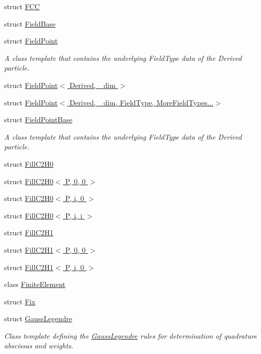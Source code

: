 \begin{DoxyCompactItemize}
struct \hyperlink{structmodel_1_1_f_c_c}{F\+C\+C}
\item 
struct \hyperlink{structmodel_1_1_field_base}{Field\+Base}
\item 
struct \hyperlink{structmodel_1_1_field_point}{Field\+Point}
\begin{DoxyCompactList}\small\item\em A class template that contains the underlying Field\+Type data of the Derived particle. \end{DoxyCompactList}\item 
struct \hyperlink{structmodel_1_1_field_point_3_01_derived_00_01__dim_01_4}{Field\+Point$<$ Derived, \+\_\+dim $>$}
\item 
struct \hyperlink{structmodel_1_1_field_point_3_01_derived_00_01__dim_00_01_field_type_00_01_more_field_types_8_8_8_4}{Field\+Point$<$ Derived, \+\_\+dim, Field\+Type, More\+Field\+Types...$>$}
\item 
struct \hyperlink{structmodel_1_1_field_point_base}{Field\+Point\+Base}
\begin{DoxyCompactList}\small\item\em A class template that contains the underlying Field\+Type data of the Derived particle. \end{DoxyCompactList}\item 
struct \hyperlink{structmodel_1_1_fill_c2_h0}{Fill\+C2\+H0}
\item 
struct \hyperlink{structmodel_1_1_fill_c2_h0_3_01_p_00_010_00_010_01_4}{Fill\+C2\+H0$<$ P, 0, 0 $>$}
\item 
struct \hyperlink{structmodel_1_1_fill_c2_h0_3_01_p_00_01i_00_010_01_4}{Fill\+C2\+H0$<$ P, i, 0 $>$}
\item 
struct \hyperlink{structmodel_1_1_fill_c2_h0_3_01_p_00_01i_00_01i_01_4}{Fill\+C2\+H0$<$ P, i, i $>$}
\item 
struct \hyperlink{structmodel_1_1_fill_c2_h1}{Fill\+C2\+H1}
\item 
struct \hyperlink{structmodel_1_1_fill_c2_h1_3_01_p_00_010_00_010_01_4}{Fill\+C2\+H1$<$ P, 0, 0 $>$}
\item 
struct \hyperlink{structmodel_1_1_fill_c2_h1_3_01_p_00_01i_00_010_01_4}{Fill\+C2\+H1$<$ P, i, 0 $>$}
\item 
class \hyperlink{classmodel_1_1_finite_element}{Finite\+Element}
\item 
struct \hyperlink{structmodel_1_1_fix}{Fix}
\item 
struct \hyperlink{structmodel_1_1_gauss_legendre}{Gauss\+Legendre}
\begin{DoxyCompactList}\small\item\em Class template defining the \hyperlink{structmodel_1_1_gauss_legendre}{Gauss\+Legendre} rules for determination of quadrature abscissas and weights. \end{DoxyCompactList}\item 

\end{DoxyCompactItemize}
